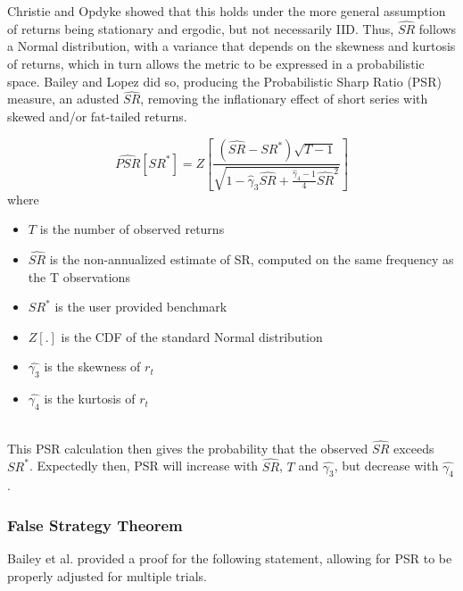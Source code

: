 \documentclass[a4paper,11pt,oneside]{article}
\theoremstyle{plain}
\theoremstyle{definition}
\begin{document}
	Christie \cite{Christie} and Opdyke \cite{Opdyke} showed that this holds under the more general assumption of returns being stationary and ergodic, but not necessarily IID. Thus, $\widehat{SR}$ follows a Normal distribution, with a variance that depends on the skewness and kurtosis of returns, which in turn allows the metric to be expressed in a probabilistic space. Bailey and Lopez did so, producing the Probabilistic Sharp Ratio (PSR) measure, an adusted $\widehat{SR}$, removing the inflationary effect of short series with skewed and/or fat-tailed returns. 
	
	\begin{equation}\label{eq_psr}
	\widehat{P S R}\left[S R^{*}\right]=Z\left[\frac{\left(\widehat{S R}-S R^{*}\right) \sqrt{T-1}}{\sqrt{1-\hat{\gamma}_{3} \widehat{S R}+\frac{\hat{\gamma}_{4}-1}{4} \widehat{S R}^{2}}}\right]
	\end{equation}
	where
	\begin{itemize}
		\item [] $T$ is the number of observed returns
		\item [] $\widehat{SR}$ is the non-annualized estimate of SR, computed on the same frequency as the T observations
		\item [] $SR^*$ is the user provided benchmark
		\item [] $Z[.]$ is the CDF of the standard Normal distribution
		\item [] $\hat{\gamma_3}$ is the skewness of $r_t$
		\item [] $\hat{\gamma_4}$ is the kurtosis of $r_t$	
	\end{itemize}
	~\\
	This PSR calculation then gives the probability that the observed $\widehat{SR}$ exceeds $SR^*$. Expectedly then, PSR will increase with $\widehat{SR}$, $T$ and $\hat{\gamma_3}$, but decrease with $\hat{\gamma_4}$.
		
	\subsubsection{False Strategy Theorem}
	
	Bailey et al. \cite{Baileyetal2014} provided a proof for the following statement, allowing for PSR to be properly adjusted for multiple trials.
	
\end{document}
